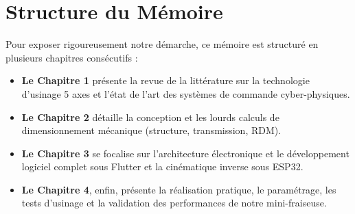 \section*{Structure du Mémoire}
Pour exposer rigoureusement notre démarche, ce mémoire est structuré en plusieurs chapitres consécutifs :
\begin{itemize}
    \item \textbf{Le Chapitre 1} présente la revue de la littérature sur la technologie d'usinage 5 axes et l'état de l'art des systèmes de commande cyber-physiques.
    \item \textbf{Le Chapitre 2} détaille la conception et les lourds calculs de dimensionnement mécanique (structure, transmission, RDM).
    \item \textbf{Le Chapitre 3} se focalise sur l'architecture électronique et le développement logiciel complet sous Flutter et la cinématique inverse sous ESP32.
    \item \textbf{Le Chapitre 4}, enfin, présente la réalisation pratique, le paramétrage, les tests d'usinage et la validation des performances de notre mini-fraiseuse.
\end{itemize}